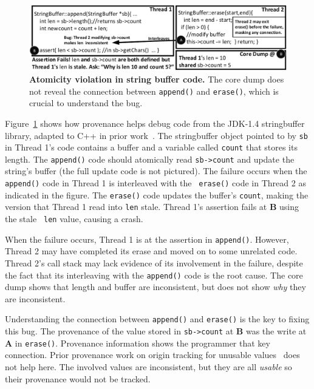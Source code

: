 \documentclass[10pt,nocopyrightspace]{sigplanconf}
\newcommand{\Caption}[1]{\begin{minipage}{.95\columnwidth} \caption{#1} \end{minipage} \vspace{-1.2ex}}
\begin{document}
\begin{figure}[h]
\centering
\includegraphics[width=\columnwidth]{figs/JDKStringBufferFail.pdf}
\Caption{\label{fig:coreDumpFail}{\bf Atomicity violation in string buffer code.} The core dump does not reveal the connection between {\tt append()} and {\tt erase()}, which is crucial to understand the bug.}
\end{figure}

Figure~\ref{fig:coreDumpFail} shows how provenance helps debug code from the
JDK-1.4 stringbuffer library, adapted to C++ in prior
work~\cite{concurrencybugs}.  The stringbuffer object pointed to by {\tt sb} in
Thread 1's code contains a buffer and a variable called {\tt count} that stores
its length.  The {\tt append()} code should atomically read {\tt sb->count} and
update the string's buffer (the full update code is not pictured).  The failure
occurs when the {\tt append()} code in Thread 1 is interleaved with the {\tt
erase()} code in Thread 2 as indicated in the figure.  The {\tt erase()} code
updates the buffer's {\tt count}, making the version that Thread 1 read into
{\tt len} stale.  Thread 1's assertion fails at {\bf B} using the stale {\tt
len} value, causing a crash.  

When the failure occurs, Thread 1 is at the assertion in {\tt append()}.
However, Thread 2 may have completed its erase and moved on to some unrelated
code.  Thread 2's call stack may lack evidence of its involvement in the
failure, despite the fact that its interleaving with the {\tt append()} code is
the root cause.  The core dump shows that length and buffer are inconsistent,
but does not show {\em why} they are inconsistent.  

Understanding the connection between {\tt append()} and {\tt erase()} is the
key to fixing this bug.  The provenance of the value stored in {\tt sb->count}
at {\bf B} was the write at {\bf A} in {\tt erase()}.  Provenance information
shows the programmer that key connection.  Prior provenance work on origin
tracking for unusable values~\cite{badapples} does not help here.  The involved
values are inconsistent, but they are all {\em usable} so their provenance
would not be tracked.   
\end{document}
